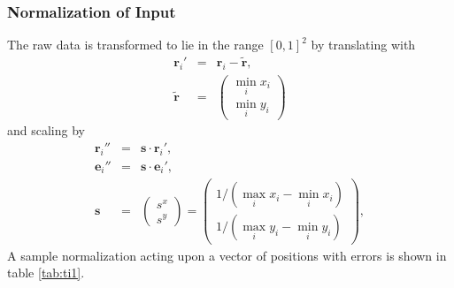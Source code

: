 \documentclass[useAMS,usenatbib]{templates/mn2e}
\begin{document}
\subsubsection{Normalization of Input}
The raw data is transformed to lie in the range $[0,1]^2$ by translating with
%
\begin{eqnarray}\label{eq:translating}
	\mathbf{r}_i' &=& \mathbf{r}_i-\tilde{\mathbf{r}},\\
	\tilde{\mathbf{r}} &=& 	\begin{pmatrix}
					\min_i x_i\\
					\min_i y_i
			       	\end{pmatrix}
\end{eqnarray}
%
and scaling by
%
\begin{eqnarray}\label{eq:scaling}
	\mathbf{r}_i''&=& \mathbf{s}\cdot\mathbf{r}_i',\\
	\mathbf{e}_i''&=& \mathbf{s}\cdot\mathbf{e}_i',\\
	\mathbf{s}   &=& \begin{pmatrix}s^x\\s^y\end{pmatrix}
                      = \begin{pmatrix}
				1/(\max_i x_i-\min_i x_i)\\
				1/(\max_i y_i-\min_i y_i)
			\end{pmatrix},
\end{eqnarray}
%
A sample normalization acting upon a vector of positions with errors
is shown in table \ref{tab:ti1}.
%
\end{document}
